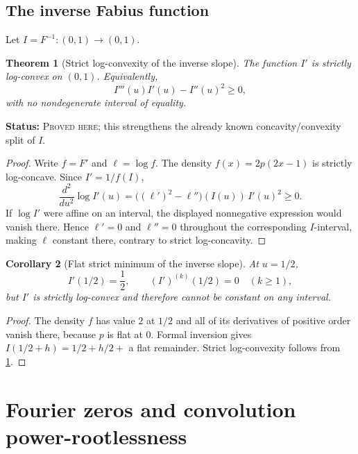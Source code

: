 \documentclass[11pt,oneside]{article}
\newtheorem{theorem}{Theorem}[section]
\newtheorem{corollary}[theorem]{Corollary}
\theoremstyle{definition}
\theoremstyle{remark}
\newcommand{\ProvedHere}{\textcolor{statusgreen}{\textsc{Proved here}}}
\newcommand{\Status}[1]{\par\smallskip\noindent\textbf{Status:} #1.\par\smallskip}
\begin{document}
\subsection{The inverse Fabius function}
Let $I=F^{-1}:(0,1)\to(0,1)$.

\begin{theorem}[Strict log-convexity of the inverse slope]\label{thm:inverse-logconvex}
The function $I'$ is strictly log-convex on $(0,1)$.  Equivalently,
\begin{equation}\label{eq:inverse-third}
 I'''(u)I'(u)-I''(u)^2\ge0,
\end{equation}
with no nondegenerate interval of equality.
\end{theorem}
\Status{\ProvedHere; this strengthens the already known concavity/convexity split
of $I$}

\begin{proof}
Write $f=F'$ and $\ell=\log f$.  The density $f(x)=2p(2x-1)$ is strictly
log-concave.  Since $I'=1/f(I)$,
\[
 \frac{d^2}{du^2}\log I'(u)
 =\bigl((\ell')^2-\ell''\bigr)(I(u))\,I'(u)^2\ge0.
\]
If $\log I'$ were affine on an interval, the displayed nonnegative expression
would vanish there.  Hence $\ell'=0$ and $\ell''=0$ throughout the corresponding
$I$-interval, making $\ell$ constant there, contrary to strict log-concavity.
\end{proof}

\begin{corollary}[Flat strict minimum of the inverse slope]\label{cor:inverse-flat}
At $u=1/2$,
\begin{equation}
 I'(1/2)=\frac12,
 \qquad (I')^{(k)}(1/2)=0\quad(k\ge1),
\end{equation}
but $I'$ is strictly log-convex and therefore cannot be constant on any interval.
\end{corollary}

\begin{proof}
The density $f$ has value $2$ at $1/2$ and all of its derivatives of positive
order vanish there, because $p$ is flat at $0$.  Formal inversion gives
$I(1/2+h)=1/2+h/2+$ a flat remainder.  Strict log-convexity follows from
\cref{thm:inverse-logconvex}.
\end{proof}

\section{Fourier zeros and convolution power-rootlessness}
\end{document}
